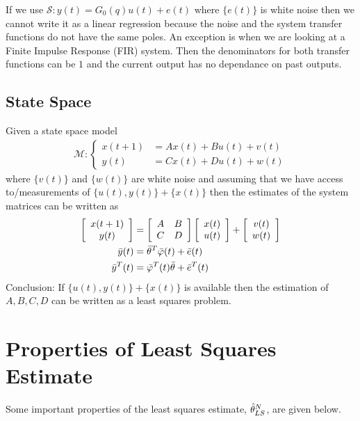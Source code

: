 If we use $\mathcal{S}: y(t) = G_0(q)u(t) + e(t)$ where $\{e(t)\}$ is white noise then we cannot write it as a linear regression because the noise and the system transfer functions do not have the same poles. An exception is when we are looking at a Finite Impulse Response (FIR) system. Then the denominators for both transfer functions can be $1$ and the current output has no dependance on past outputs.

\subsection{State Space}
Given a state space model
\begin{align*}
\mathcal{M}: \begin{cases} x(t+1)&=Ax(t)+Bu(t)+v(t) \\ y(t)&=Cx(t)+Du(t)+w(t) \end{cases}
\end{align*}
where $\{v(t)\}$ and $\{w(t)\}$ are white noise and assuming that we have access to/measurements of $\{u(t),y(t)\} + \{x(t)\}$ then the estimates of the system matrices can be written as
\begin{align}
\left[\begin{array}{c} x(t+1) \\ y(t) \end{array}\right] &=
\left[\begin{array}{c c} A & B \\ C & D \end{array}\right] \left[\begin{array}{c} x(t) \\ u(t) \end{array}\right] +
\left[\begin{array}{c} v(t) \\ w(t) \end{array}\right] \nonumber \\
\bar{y}(t) &= \bar{\theta}^T\bar{\varphi}(t) + \bar{e}(t) \nonumber \\
\bar{y}^T(t) &= \bar{\varphi}^T(t)\bar{\theta} + \bar{e}^T(t)
\end{align}
Conclusion: If $\{u(t),y(t)\} + \{x(t)\}$ is available then the estimation of $A,B,C,D$ can be written as a least squares problem.

\section{Properties of Least Squares Estimate}
Some important properties of the least squares estimate, $\hat{\theta}_{LS}^N$, are given below.

